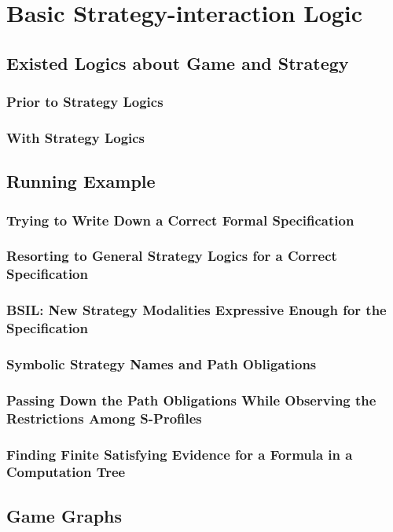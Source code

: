 \chapter{Basic Strategy-interaction Logic}
\label{c:bsil}

\section{Existed Logics about Game and Strategy}
\subsection{Prior to Strategy Logics}
\subsection{With Strategy Logics}

\section{Running Example}
\subsection{Trying to Write Down a Correct Formal Specification}
\subsection{Resorting to General Strategy Logics for a Correct Specification}
\subsection{BSIL: New Strategy Modalities Expressive Enough for the Specification}
\subsection{Symbolic Strategy Names and Path Obligations}
\subsection{Passing Down the Path Obligations While Observing the Restrictions Among S-Profiles}
\subsection{Finding Finite Satisfying Evidence for a Formula in a Computation Tree}

\section{Game Graphs}
